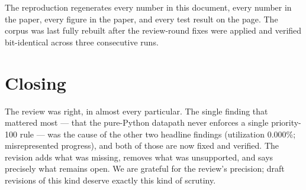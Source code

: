 \documentclass[11pt,a4paper]{article}
\begin{document}
The reproduction regenerates every number in this document, every number in
the paper, every figure in the paper, and every test result on the page.
The corpus was last fully rebuilt after the review-round fixes were applied
and verified bit-identical across three consecutive runs.

\section{Closing}

The review was right, in almost every particular. The single finding that
mattered most --- that the pure-Python datapath never enforces a single
priority-100 rule --- was the cause of the other two headline findings
(utilization 0.000\%; misrepresented progress), and both of those are now
fixed and verified. The revision adds what was missing, removes what was
unsupported, and says precisely what remains open. We are grateful for the
review's precision; draft revisions of this kind deserve exactly this kind of
scrutiny.
\end{document}
